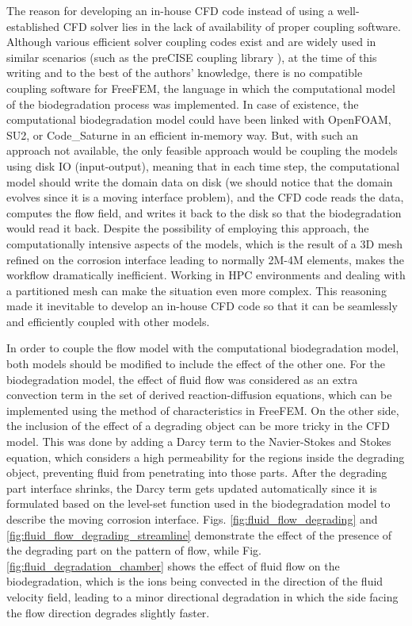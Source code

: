 The reason for developing an in-house \gls{CFD} code instead of using a well-established \gls{CFD} solver lies in the lack of availability of proper coupling software. Although various efficient solver coupling codes exist and are widely used in similar scenarios (such as the preCISE coupling library \cite{preCICEv2}), at the time of this writing and to the best of the authors' knowledge, there is no compatible coupling software for FreeFEM, the language in which the computational model of the biodegradation process was implemented. In case of existence, the computational biodegradation model could have been linked with OpenFOAM, SU2, or Code\_Saturne in an efficient in-memory way. But, with such an approach not available, the only feasible approach would be coupling the models using disk \gls{IO} (input-output), meaning that in each time step, the computational model should write the domain data on disk (we should notice that the domain evolves since it is a moving interface problem), and the \gls{CFD} code reads the data, computes the flow field, and writes it back to the disk so that the biodegradation would read it back. Despite the possibility of employing this approach, the computationally intensive aspects of the models, which is the result of a 3D mesh refined on the corrosion interface leading to normally 2M-4M elements, makes the workflow dramatically inefficient. Working in \gls{HPC} environments and dealing with a partitioned mesh can make the situation even more complex. This reasoning made it inevitable to develop an in-house \gls{CFD} code so that it can be seamlessly and efficiently coupled with other models.

In order to couple the flow model with the computational biodegradation model, both models should be modified to include the effect of the other one. For the biodegradation model, the effect of fluid flow was considered as an extra convection term in the set of derived reaction-diffusion equations, which can be implemented using the method of characteristics in FreeFEM. On the other side, the inclusion of the effect of a degrading object can be more tricky in the \gls{CFD} model. This was done by adding a Darcy term to the Navier-Stokes and Stokes equation, which considers a high permeability for the regions inside the degrading object, preventing fluid from penetrating into those parts. After the degrading part interface shrinks, the Darcy term gets updated automatically since it is formulated based on the level-set function used in the biodegradation model to describe the moving corrosion interface. Figs. \ref{fig:fluid_flow_degrading} and \ref{fig:fluid_flow_degrading_streamline} demonstrate the effect of the presence of the degrading part on the pattern of flow, while Fig.
\ref{fig:fluid_degradation_chamber} shows the effect of fluid flow on the biodegradation, which is the ions being convected in the direction of the fluid velocity field, leading to a minor directional degradation in which the side facing the flow direction degrades slightly faster.

